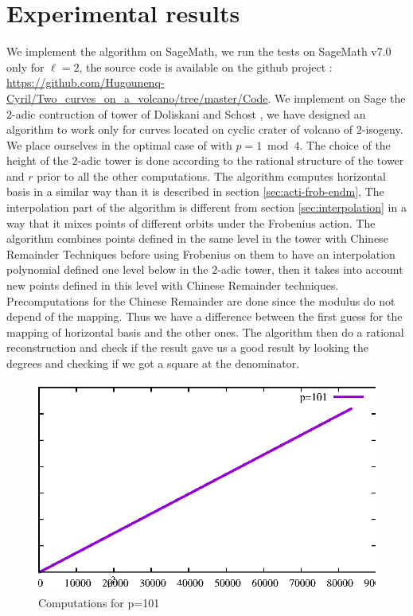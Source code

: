 \documentclass{lms}
\begin{document}
\section{Experimental results}
\label{sec:implem}
We implement the algorithm on SageMath, we run the tests on SageMath v7.0 only for $\ell=2$, the source code is available on the github project : \url{https://github.com/Hugounenq-Cyril/Two_curves_on_a_volcano/tree/master/Code}.
We implement on Sage the $2$-adic contruction of tower of Doliskani and Schost \cite{DoSc12}, we have designed an algorithm to work only for curves located on cyclic crater of volcano of $2$-isogeny. 
 We place ourselves in the optimal case of \cite{DoSc12} with $p = 1 \bmod 4$. 
 \newline 
The choice of the height of the $2$-adic tower is done according to the rational structure of the tower and $r$ prior to all the other computations. The algorithm computes horizontal basis in a similar way than it is described in section \ref{sec:acti-frob-endm}, 
\newline
The interpolation part of the algorithm is different from section \ref{sec:interpolation} in a way that it mixes points of different orbits under the Frobenius action. The algorithm combines points defined in the same level in the tower with Chinese Remainder Techniques before using Frobenius on them to have an interpolation polynomial defined one level below in the $2$-adic tower, then it takes into account new points defined in this level with Chinese Remainder techniques. Precomputations for the Chinese Remainder are done since the modulus do not depend of the mapping. Thus we have a difference between the first guess for the mapping of horizontal basis and the other ones. The algorithm then do a rational reconstruction and check if the result gave us a good result by looking the degrees and checking if we got a square at the denominator.
 \newline
\begin{figure}\label{fig:p=101}
\centering
\includegraphics[scale=1]{Code/creat.eps}
\caption{Computations for p=101}
\end{figure}
\end{document}
